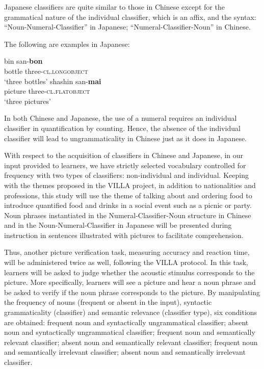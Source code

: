 \documentclass[output=paper,colorlinks,citecolor=brown,modfonts,nonflat]{../langscibook}
\begin{document}
Japanese classifiers are quite similar to those in Chinese except for the grammatical nature of the individual classifier, which is an affix, and the syntax: “Noun-Numeral-Classifier” in Japanese; “Numeral-Classifier-Noun” in Chinese.

The following are examples in Japanese:%

\ea%
    \label{ex:watorek:15}
    \ea%
    \label{ex:watorek:15a}
    \gll    bin san-\textbf{{bon}}\\
            bottle three-{\textsc{cl.longobject}}\\
    \glt    ‘three bottles’        
    \ex%
    \label{ex:watorek:15b}
    \gll    shashin san-\textbf{{mai}}\\
            picture three-\textsc{cl.flatobject}\\
    \glt    ‘three pictures’ 
    \z
\z

In both Chinese and Japanese, the use of a numeral requires an individual classifier in quantification by counting. Hence, the absence of the individual classifier will lead to ungrammaticality in Chinese just as it does in Japanese. 

With respect to the acquisition of classifiers in Chinese and Japanese, in our input provided to learners, we have strictly selected vocabulary controlled for frequency with two types of classifiers: non-individual and individual. Keeping with the themes proposed in the VILLA project, in addition to nationalities and professions, this study will use the theme of talking about and ordering food to introduce quantified food and drinks in a social event such as a picnic or party. Noun phrases instantiated in the Numeral-Classifier-Noun structure in Chinese and in the Noun-Numeral-Classifier in Japanese will be presented during instruction in sentences illustrated with pictures to facilitate comprehension.

Thus, another picture verification task, measuring accuracy and reaction time, will be administered twice as well, following the VILLA protocol. In this task, learners will be asked to judge whether the acoustic stimulus corresponds to the picture. More specifically, learners will see a picture and hear a noun phrase and be asked to verify if the noun phrase corresponds to the picture. By manipulating the frequency of nouns (frequent or absent in the input), syntactic grammaticality (classifier) and semantic relevance (classifier type), six conditions are obtained: frequent noun and syntactically ungrammatical classifier; absent noun and syntactically ungrammatical classifier; frequent noun and semantically relevant classifier; absent noun and semantically relevant classifier; frequent noun and semantically irrelevant classifier; absent noun and semantically irrelevant classifier.
\end{document}
